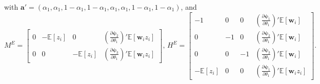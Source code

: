 \begin{lem}
  with $\mathbf{a}' = (\alpha_1, \alpha_1, 1 - \alpha_1, 1 - \alpha_1, \alpha_1, \alpha_1, 1 - \alpha_1, 1 - \alpha_1)$,
and 
\[
  M^E = \left[ 
    \begin{array}{cccc} 
      0 & -\mathbb{E}[z_i] & 0 & \left( \frac{\partial \boldsymbol{\psi}_2}{\partial \theta_1} \right)' \mathbb{E}[\mathbf{w}_iz_i]\\ 
      0 & 0 & -\mathbb{E}[z_i] & \left( \frac{\partial \boldsymbol{\psi}_3}{\partial \theta_1} \right)' \mathbb{E}[\mathbf{w}_iz_i] 
  \end{array} \right], \,
H^E = \left[
\begin{array}{cccc}
  -1 & 0 & 0 
  & \left(\frac{\partial \boldsymbol{\psi}_1}{\partial \theta_1}\right)'\mathbb{E}[\mathbf{w}_i]\\
   0 & -1 & 0 &  \left(\frac{\partial \boldsymbol{\psi}_2}{\partial \theta_1}\right)'\mathbb{E}[\mathbf{w}_i]\\
   0 & 0 & -1 & \left(\frac{\partial \boldsymbol{\psi}_3}{\partial \theta_1}\right)'\mathbb{E}[\mathbf{w}_i]\\
   -\mathbb{E}[z_i] & 0 & 0 &  \left(\frac{\partial \boldsymbol{\psi}_1}{\partial \theta_1}\right)'\mathbb{E}[\mathbf{w}_iz_i]
\end{array}
\right].
\]
\label{lem:prelim}
\end{lem}

